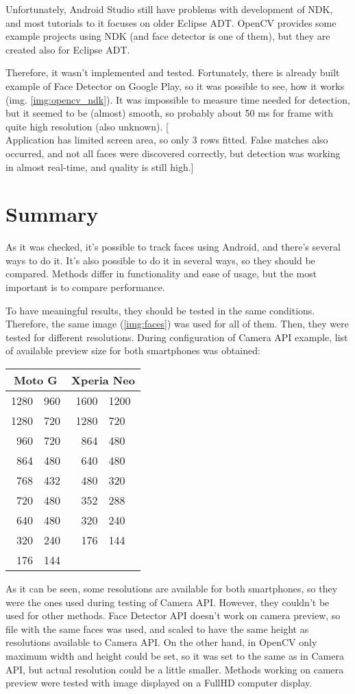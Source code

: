 Unfortunately, Android Studio still have problems with development of NDK, and
most tutorials to it focuses on older Eclipse ADT. 
OpenCV provides some example projects using NDK (and face detector is one of
them), but they are created also for Eclipse ADT.

Therefore, it wasn't implemented and tested. 
Fortunately, there is already built example of Face Detector on Google Play, so
it was possible to see, how it works (img. \ref{img:opencv_ndk}). 
It was impossible to measure time needed for
detection, but it seemed to be (almost) smooth, so probably about 50 ms for
frame with quite high resolution (also unknown).
[\\Application has limited screen area, so only 3 rows fitted. False matches
also occurred, and not all faces were discovered correctly, but detection was
working in almost real-time, and quality is still high.]

\section{Summary}
As it was checked, it's possible to track faces using Android, and there's
several ways to do it. 
It's also possible to do it in several ways, so they should be compared.
Methods differ in functionality and ease of usage, but the most important is to
compare performance.

To have meaningful results, they should be tested in the same conditions.
Therefore, the same image (\ref{img:faces}) was used for all of them.
Then, they were tested for different resolutions.
During configuration of Camera API example, list of available preview size for
both smartphones was obtained:
\begin{center}
\begin{tabular}{r@{ x }l|r@{ x }l}
\multicolumn{2}{c|}{Moto G} & \multicolumn{2}{c}{Xperia Neo} \\
\hline
1280 & 960 & 1600 & 1200 \\
1280 & 720 & 1280 & 720 \\
960 & 720 & 864 & 480 \\
864 & 480 & 640 & 480 \\
768 & 432 & 480 & 320 \\
720 & 480 & 352 & 288 \\
640 & 480 & 320 & 240 \\
320 & 240 & 176 & 144 \\
176 & 144 \\
\end{tabular}
\end{center}
As it can be seen, some resolutions are available for both smartphones, so they
were the ones used during testing of Camera API. 
However, they couldn't be used for other methods.
Face Detector API doesn't work on camera preview, so file with the same faces
was used, and scaled to have the same height as resolutions available to Camera API. 
On the other hand, in OpenCV only maximum width and height could be set, so it
was set to the same as in Camera API, but actual resolution could be a little
smaller.
Methods working on camera preview were tested with image displayed on a FullHD
computer display.

